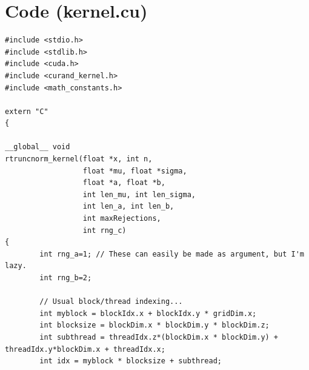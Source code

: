 \documentclass{article}
\begin{document}
\section{Code (kernel.cu)}

\begin{verbatim}
#include <stdio.h>                                                              
#include <stdlib.h>                                                             
#include <cuda.h>                                                               
#include <curand_kernel.h>                                                      
#include <math_constants.h>                                                     
                                                                                
extern "C"                                                                      
{                                                                               
                                                                                
__global__ void                                                                 
rtruncnorm_kernel(float *x, int n,                                              
                  float *mu, float *sigma,                                      
                  float *a, float *b,                                           
                  int len_mu, int len_sigma,                                    
                  int len_a, int len_b,                                         
                  int maxRejections,                                            
                  int rng_c)                                                    
{                                                                               
        int rng_a=1; // These can easily be made as argument, but I'm lazy.     
        int rng_b=2;                                                            
                                                                                
        // Usual block/thread indexing...                                       
        int myblock = blockIdx.x + blockIdx.y * gridDim.x;                      
        int blocksize = blockDim.x * blockDim.y * blockDim.z;                   
        int subthread = threadIdx.z*(blockDim.x * blockDim.y) + threadIdx.y*blockDim.x + threadIdx.x;
        int idx = myblock * blocksize + subthread;                              
                                                                                

\end{verbatim}
\end{document}
